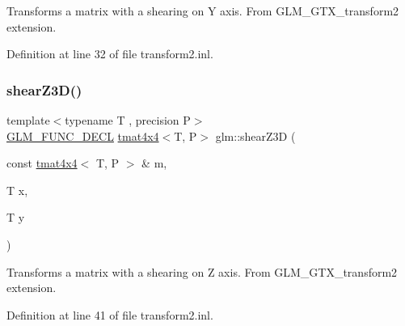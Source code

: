 Transforms a matrix with a shearing on Y axis. From G\+L\+M\+\_\+\+G\+T\+X\+\_\+transform2 extension. 

Definition at line 32 of file transform2.\+inl.

\mbox{\label{group__gtx__transform2_ga5558ac64a7144685bf2eb4483a0e2f51}} 
\subsubsection{\texorpdfstring{shearZ3D()}{shearZ3D()}}
{\footnotesize\ttfamily template$<$typename T , precision P$>$ \\
\mbox{\hyperlink{setup_8hpp_ab2d052de21a70539923e9bcbf6e83a51}{G\+L\+M\+\_\+\+F\+U\+N\+C\+\_\+\+D\+E\+CL}} \mbox{\hyperlink{structglm_1_1tmat4x4}{tmat4x4}}$<$T, P$>$ glm\+::shear\+Z3D (\begin{DoxyParamCaption}\item[{const \mbox{\hyperlink{structglm_1_1tmat4x4}{tmat4x4}}$<$ T, P $>$ \&}]{m,  }\item[{T}]{x,  }\item[{T}]{y }\end{DoxyParamCaption})}

Transforms a matrix with a shearing on Z axis. From G\+L\+M\+\_\+\+G\+T\+X\+\_\+transform2 extension. 

Definition at line 41 of file transform2.\+inl.

